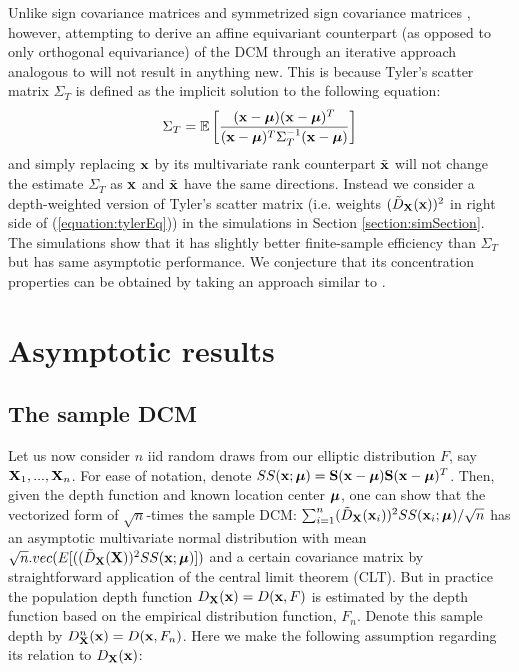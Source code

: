 \documentclass[fleqn,11pt]{article}
\begin{document}
Unlike sign covariance matrices and symmetrized sign covariance matrices \citep{dumbgen98}, however, attempting to derive an affine equivariant counterpart (as opposed to only orthogonal equivariance) of the DCM through an iterative approach analogous to \cite{tyler87} will not result in anything new. This is because Tyler's scatter matrix $\Sigma_T$ is defined as the implicit solution to the following equation:
\begin{equation} \label{equation:tylerEq}
\Sigma_T = \mathbb E\left[ \frac{({\bf{x}} - {\boldsymbol{\mu}}) ({\bf{x}} - {\boldsymbol{\mu}})^T}{({\bf{x}} - {\boldsymbol{\mu}})^T \Sigma_T^{-1} ({\bf{x}} - {\boldsymbol{\mu}})} \right]
\end{equation}
and simply replacing ${\bf{x}}$ by its multivariate rank counterpart $\tilde{{\bf{x}}}$ will not change the estimate $\Sigma_T$ as ${\bf{x}}$ and $\tilde {{\bf{x}}}$ have the same directions. Instead we consider a depth-weighted version of Tyler's scatter matrix (i.e. weights $(\tilde D_{\mathbf{X}}({\bf{x}}))^2$ in right side of (\ref{equation:tylerEq})) in the simulations in Section \ref{section:simSection}. The simulations show that it has slightly better finite-sample efficiency than $\Sigma_T$ but has same asymptotic performance. We conjecture that its concentration properties can be obtained by taking an approach similar to \cite{soloveychik14}.

\section{Asymptotic results}\label{section:sec4}
\subsection{The sample DCM}
Let us now consider $n$ iid random draws from our elliptic distribution $F$, say ${\mathbf{X}}_1,...,{\mathbf{X}}_n$. For ease of notation, denote $SS({\bf{x}}; {\boldsymbol{\mu}}) = {\mathbf{S}}({\bf{x}} - {\boldsymbol{\mu}}) {\mathbf{S}}({\bf{x}} - {\boldsymbol{\mu}})^T$. Then, given the depth function and known location center ${\boldsymbol{\mu}}$, one can show that the vectorized form of $\sqrt n$-times the sample DCM: $\sum_{i=1}^n (\tilde D_{\mathbf{X}}({\bf{x}}_i))^2SS({\bf{x}}_i; {\boldsymbol{\mu}}) /\sqrt{n}$  has an asymptotic multivariate normal distribution with mean $\sqrt n.vec(E[( (\tilde D_{\mathbf{X}} ({\mathbf{X}}))^2 SS({\bf{x}}; {\boldsymbol{\mu}})])$ and a certain covariance matrix by straightforward application of the central limit theorem (CLT). But in practice the population depth function $D_{\mathbf{X}}({\bf{x}}) = D({\bf{x}}, F)$ is estimated by the depth function based on the empirical distribution function, $F_n$. Denote this sample depth by $D^n_{\mathbf{X}} ({\bf{x}}) = D({\bf{x}}, F_n)$. Here we make the following assumption regarding its relation to $D_{\mathbf{X}}({\bf{x}})$:
\end{document}
